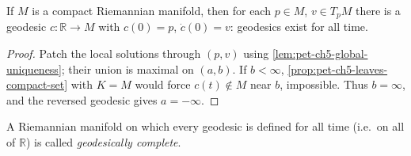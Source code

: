 \begin{corollary}
  \label{cor:pet-ch5-compact-manifold-complete}
  \leanok
  If $M$ is a compact Riemannian manifold, then for each $p\in M$, $v\in T_pM$
  there is a geodesic $c:\mathbb R\to M$ with $c(0)=p$, $\dot c(0)=v$: geodesics exist
  for all time.
\end{corollary}
\begin{proof}
  \sketch
  Patch the local solutions through $(p,v)$ using
  \cref{lem:pet-ch5-global-uniqueness}; their union is maximal on $(a,b)$.
  If $b<\infty$, \cref{prop:pet-ch5-leaves-compact-set} with $K=M$ would force
  $c(t)\notin M$ near $b$, impossible.  Thus $b=\infty$, and the reversed
  geodesic gives $a=-\infty$.
\end{proof}

\begin{definition}
  \label{def:pet-ch5-geodesically-complete}
  \leanok
  A Riemannian manifold on which every geodesic is defined for all time (i.e.\ on
  all of $\mathbb R$) is called \emph{geodesically complete}.
\end{definition}

